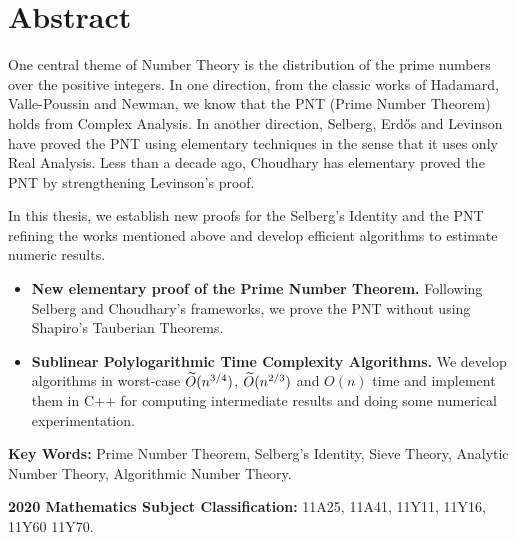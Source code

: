 \chapter*{Abstract}
One central theme of Number Theory is the distribution of
the prime numbers over the positive integers.
In one direction,
from the classic works of
Hadamard, Valle-Poussin and Newman,
we know that the PNT (Prime Number Theorem) holds
from Complex Analysis.
In another direction,
Selberg, Erdős and Levinson
have proved the PNT
using elementary techniques in the sense that
it uses only Real Analysis.
Less than a decade ago,
Choudhary has elementary proved the PNT
by strengthening Levinson's proof.

In this thesis,
we establish new proofs for
the Selberg's Identity
and the PNT
refining the works mentioned above
and develop efficient algorithms to estimate numeric results.

\begin{itemize}
    \item
    \textbf{New elementary proof of the Prime Number Theorem.}
    Following Selberg and Choudhary's frameworks,
    we prove the PNT without using
    Shapiro's Tauberian Theorems.

    \item
    \textbf{Sublinear Polylogarithmic Time Complexity Algorithms.}
    We develop algorithms in worst-case
    \(\widetilde{O}(n^{3/4})\), \(\widetilde{O}(n^{2/3})\) and \(O(n)\)
    time and implement them in C++
    for computing intermediate results
    and doing some numerical experimentation.
\end{itemize}

\bigskip
\textbf{Key Words:}
Prime Number Theorem,
Selberg's Identity,
Sieve Theory,
Analytic Number Theory,
Algorithmic Number Theory.

\bigskip
\textbf{2020 Mathematics Subject Classification:}
11A25,
11A41,
11Y11,
11Y16,
11Y60
11Y70.

\setcounter{page}{4}
